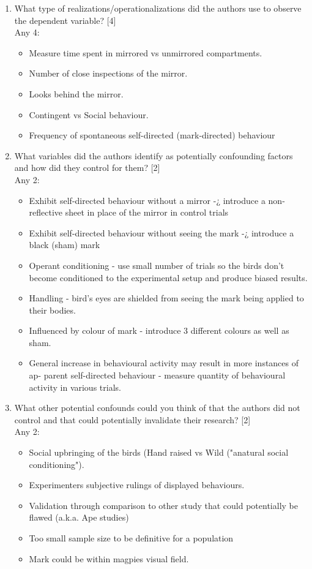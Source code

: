 \documentclass[12pt,english]{scrartcl}
\begin{document}
\begin{enumerate}
 \color{black}
 \item What type of realizations/operationalizations did the authors use to observe the dependent variable? [4] \\
 \color{blue}
 Any 4:
 \begin{itemize}
  \item Measure time spent in mirrored vs unmirrored compartments.
  \item Number of close inspections of the mirror.
  \item Looks behind the mirror.
  \item Contingent vs Social behaviour.
  \item Frequency of spontaneous self-directed (mark-directed) behaviour
 \end{itemize}
 
 \color{black}
 \item What variables did the authors identify as potentially confounding factors and how did they control for them? [2] \\
 \color{blue}
 Any 2:
 \begin{itemize}
  \item Exhibit self-directed behaviour without a mirror -¿ introduce a non-reflective
sheet in place of the mirror in control trials
  \item Exhibit self-directed behaviour without seeing the mark -¿ introduce a black
(sham) mark
  \item Operant conditioning - use small number of trials so the birds don't become
conditioned to the experimental setup and produce biased results.
  \item Handling - bird's eyes are shielded from seeing the mark being applied to
their bodies.
  \item Influenced by colour of mark - introduce 3 different colours as well as sham.
  \item General increase in behavioural activity may result in more instances of ap-
parent self-directed behaviour - measure quantity of behavioural activity in
various trials.
 \end{itemize}
 
 \color{black}
 \item What other potential confounds could you think of that the authors did not control and that could potentially invalidate their research? [2] \\
 \color{blue}
 Any 2:
 \begin{itemize}
  \item Social upbringing of the birds (Hand raised vs Wild ("anatural social conditioning").
  \item Experimenters subjective rulings of displayed behaviours.
  \item Validation through comparison to other study that could potentially be flawed
(a.k.a. Ape studies)
  \item Too small sample size to be definitive for a population
  \item Mark could be within magpies visual field.
 \end{itemize}
 

\end{enumerate}
\end{document}
